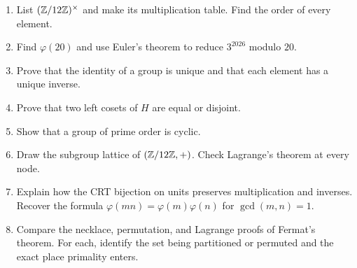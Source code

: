 \begin{exercisebox}
\begin{enumerate}
  \item List $(\mathbb Z/12\mathbb Z)^\times$ and make its multiplication table. Find the order of every element. 
  \item Find $\varphi(20)$ and use Euler's theorem to reduce $3^{2026}$ modulo $20$. 
  \item Prove that the identity of a group is unique and that each element has a unique inverse. 
  \item Prove that two left cosets of $H$ are equal or disjoint. 
  \item Show that a group of prime order is cyclic. 
  \item Draw the subgroup lattice of $(\mathbb Z/12\mathbb Z,+)$. Check Lagrange's theorem at every node. 
  \item Explain how the CRT bijection on units preserves multiplication
  and inverses. Recover the formula $\varphi(mn)=\varphi(m)\varphi(n)$
  for $\gcd(m,n)=1$. 
  \item Compare the necklace, permutation, and Lagrange proofs of Fermat's theorem. For each, identify the set being partitioned or permuted and the exact place primality enters. 
\end{enumerate}
\end{exercisebox}
